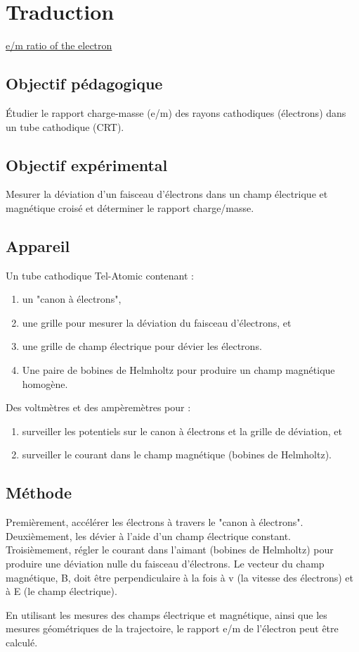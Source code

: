 \documentclass[../main.tex]{subfiles}
\begin{document}
\section{Traduction}

\href{https://physicsx.erau.edu/HelmholtzCoils/Lab_MP_1.pdf}{e/m ratio of the electron}
    
\subsection{Objectif pédagogique}
Étudier le rapport charge-masse (e/m) des rayons cathodiques (électrons) dans un tube cathodique (CRT). 
\subsection{Objectif expérimental}
Mesurer la déviation d'un faisceau d'électrons dans un champ électrique et magnétique croisé et déterminer le rapport charge/masse.  
\subsection{Appareil}
Un tube cathodique Tel-Atomic contenant :
\begin{enumerate}
    \item un "canon à électrons", 
    \item une grille pour mesurer la déviation du faisceau d'électrons, et 
    \item une grille de champ électrique pour dévier les électrons. 
    \item Une paire de bobines de Helmholtz pour produire un champ magnétique homogène.   
\end{enumerate}
Des voltmètres et des ampèremètres pour : \\
\begin{enumerate}
    \item surveiller les potentiels sur le canon à électrons et la grille de déviation, et
    \item surveiller le courant dans le champ magnétique (bobines de Helmholtz).
\end{enumerate}
\subsection{Méthode}
Premièrement, accélérer les électrons à travers le "canon à électrons".  Deuxièmement, les dévier à l'aide d'un champ électrique constant.  Troisièmement, régler le courant dans l'aimant (bobines de Helmholtz) pour produire une déviation nulle du faisceau d'électrons.  Le vecteur du champ magnétique, B, doit être perpendiculaire à la fois à v (la vitesse des électrons) et à E (le champ électrique).\\
\par En utilisant les mesures des champs électrique et magnétique, ainsi que les mesures géométriques de la trajectoire, le rapport e/m de l'électron peut être calculé.
\end{document}
